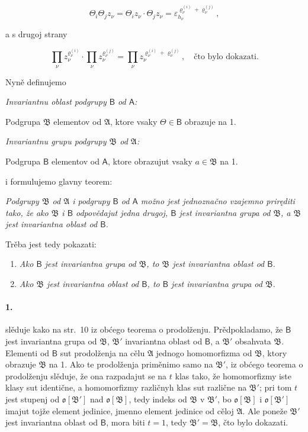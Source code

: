 \documentclass[11pt]{article}
\begin{document}
\[
\Theta_i\Theta_j z_\nu=\Theta_i z_\nu\cdot \Theta_j z_\nu
=\varepsilon_{h_\nu}^{\varrho_\nu^{(i)}+\varrho_\nu^{(j)}},
\]

a s drugoj strany

\[
\prod_\nu z_\nu^{\varrho_\nu^{(i)}}\cdot
\prod_\nu z_\nu^{\varrho_\nu^{(j)}}=
\prod_\nu z_\nu^{\varrho_\nu^{(i)}+\varrho_\nu^{(j)}},
\quad\text{čto bylo dokazati.}
\]

Nyně definujemo

\emph{Invariantnu oblast podgrupy \(\mathsf B\) od \(\mathsf A\):}

Podgrupa \(\mathfrak B\) elementov od \(\mathfrak A\), ktore vsaky \(\Theta\in\mathsf B\) obrazuje na 1.

\emph{Invariantnu grupu podgrupy \(\mathfrak B\) od \(\mathfrak A\):}

Podgrupa \(\mathsf B\) elementov od \(\mathsf A\), ktore obrazujut vsaky \(a\in\mathfrak B\) na 1.

i formulujemo glavny teorem:

\emph{Podgrupy \(\mathfrak B\) od \(\mathfrak A\) i podgrupy \(\mathsf B\) od \(\mathsf A\) možno jest jednoznačno vzajemno priręditi tako, že ako \(\mathfrak B\) i \(\mathsf B\) odpovědajut jedna drugoj, \(\mathsf B\) jest invariantna grupa od \(\mathfrak B\), a \(\mathfrak B\) jest invariantna oblast od \(\mathsf B\).}

Trěba jest tedy pokazati:

\begin{enumerate}
\item \emph{Ako \(\mathsf B\) jest invariantna grupa od \(\mathfrak B\), to \(\mathfrak B\) jest invariantna oblast od \(\mathsf B\).}
\item \emph{Ako \(\mathfrak B\) jest invariantna oblast od \(\mathsf B\), to \(\mathsf B\) jest invariantna grupa od \(\mathfrak B\).}
\end{enumerate}

\paragraph{1.}
slěduje kako na str.~10 iz obćego teorema o prodolženju. Prědpokladamo, že \(\mathsf B\) jest invariantna grupa od \(\mathfrak B\), \(\mathfrak B'\) invariantna oblast od \(\mathsf B\), a \(\mathfrak B'\) obsahvata \(\mathfrak B\). Elementi od \(\mathsf B\) sut prodolženja na cělu \(\mathfrak A\) jednogo homomorfizma od \(\mathfrak B\), ktory obrazuje \(\mathfrak B\) na 1. Ako te prodolženja priměnimo samo na \(\mathfrak B'\), iz obćego teorema o prodolženju slěduje, že ona razpadajut se na \(t\) klas tako, že homomorfizmy iste klasy sut identične, a homomorfizmy različnyh klas sut različne na \(\mathfrak B'\); pri tom \(t\) jest stupenj od \(\mathfrak o[\mathfrak B']\) nad \(\mathfrak o[\mathfrak B]\), tedy indeks od \(\mathfrak B\) v \(\mathfrak B'\), bo \(\mathfrak o[\mathfrak B]\) i \(\mathfrak o[\mathfrak B']\) imajut tojže element jedinice, jmenno element jedinice od cěloj \(\mathfrak A\). Ale poneže \(\mathfrak B'\) jest invariantna oblast od \(\mathsf B\), mora biti \(t=1\), tedy \(\mathfrak B'=\mathfrak B\), čto bylo dokazati.
\end{document}
